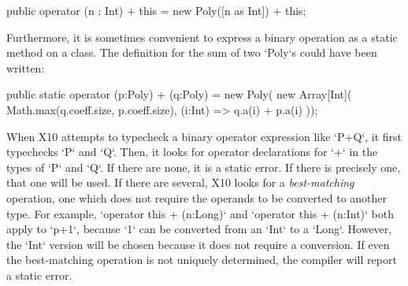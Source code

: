 \begin{ex}
% 
\begin{xten}
   public operator (n : Int) + this = new Poly([n as Int]) + this;
\end{xten}
% 
%     

Furthermore, it is sometimes convenient to express a binary operation as a
static method on a class. 
The definition for the sum of two
\xcd`Poly`s could have been written:
\begin{xten}
  public static operator (p:Poly) + (q:Poly) =  new Poly(
     new Array[Int](
        Math.max(q.coeff.size, p.coeff.size),
        (i:Int) => q.a(i) + p.a(i)
     ));
\end{xten}
%
% 
%     

\end{ex}

When X10 attempts to typecheck a binary operator expression like \xcd`P+Q`, it
first typechecks \xcd`P` and \xcd`Q`. Then, it looks for operator declarations
for \xcd`+` in the types of \xcd`P` and \xcd`Q`. If there are none, it is a
static error. If there is precisely one, that one will be used. If there are
several, X10 looks for a {\em best-matching} operation, \viz{} one which does
not require the operands to be converted to another type. For example,
\xcd`operator this + (n:Long)` and \xcd`operator this + (n:Int)` both apply to
\xcd`p+1`, because \xcd`1` can be converted from an \xcd`Int` to a \xcd`Long`.
However, the \xcd`Int` version will be chosen because it does not require a
conversion. If even the best-matching operation is not uniquely determined,
the compiler will report a static error.


